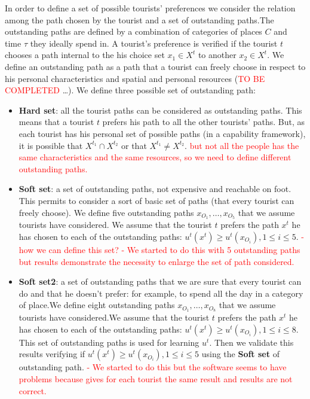 \documentclass[version=last, pagesize, twoside=semi, DIV=calc, 12pt, a4paper, french, english]{scrartcl}
\begin{document}
In order to define a set of  possible tourists' preferences we consider the relation among the path chosen by the tourist and a set of outstanding paths.The outstanding paths are defined by a combination of categories of places $C$ and time $\tau$ they ideally spend in. A tourist's preference is verified if the tourist $t$ chooses a path internal to the his choice set $x_1 \in X^t$ to another $x_2 \in X^t$. We define an outstanding path as a path that a tourist can freely choose in respect to his personal characteristics and spatial and personal resources (\textcolor{red}{TO BE COMPLETED} \dots). We define three possible set of outstanding path:
                                            \begin{itemize}
                                                \item \textbf{Hard set}: all the tourist paths can be considered as outstanding paths. This means that a tourist $t$ prefers his path to all the other tourists' paths. But, as each tourist has his personal set of possible paths (in a capability framework), it is possible that $X^{t_1}\cap X^{t_2}$ or that $X^{t_1}\neq X^{t_2}$.
                                                    \subitem {-} \textcolor{red}{but not all the people has the same characteristics and the same resources, so we need to define different outstanding paths.}
                                                \item \textbf{Soft set}: a set of outstanding paths, not expensive and reachable on foot. This permits to consider a sort of basic set of paths (that every tourist can freely choose). We define five outstanding paths $x_{O_1}, \ldots, x_{O_5}$ that we assume tourists have considered. We assume that the tourist $t$ prefers the path $x^t$ he has chosen to each of the outstanding paths: $u^t(x^t) \geq u^t(x_{O_i}), 1 \leq  i \leq 5$.
                                                    \textcolor{red}{
                                                    \subitem - how we can define this set?
                                                    \subitem - We started to do this with 5 outstanding paths but results demonstrate the necessity to enlarge the set of path considered.}
                                                \item \textbf{Soft set2}: a set of outstanding paths that we are sure that every tourist can do and that he doesn't prefer: for example, to spend all the day in a category of place.We define eight outstanding paths $x_{O_1}, \ldots, x_{O_8}$ that we assume tourists have considered.We assume that the tourist $t$ prefers the path $x^t$ he has chosen to each of the outstanding paths: $u^t(x^t) \geq u^t(x_{O_i}), 1 \leq  i \leq 8$. This set of outstanding paths is used for learning $u^t$. Then we validate this results verifying if $u^t(x^t)\geq u^t(x_{O_i}), 1 \leq  i \leq 5$ using the \textbf{Soft set} of outstanding path.
                                                    \textcolor{red}{
                                                    \subitem - We started to do this but the software seems to have problems because gives for each tourist the same result and results are not correct.}
                                              \end{itemize}
\end{document}
